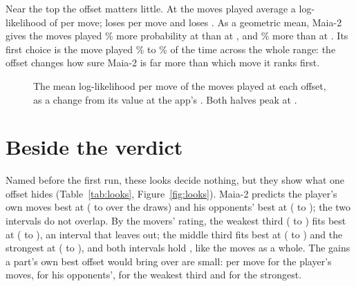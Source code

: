 \documentclass[11pt]{article}
\begin{document}
Near the top the offset matters little. At \AppOffset{} the moves played average a
log-likelihood of \LLBase{} per move; \OffsetMin{} loses \LossAtMin{} per move and \OffsetMax{}
loses \LossAtMax. As a geometric mean, Maia-2 gives the moves played \RatioAtMin\% more
probability at \AppOffset{} than at \OffsetMin, and \RatioAtMax\% more than at \OffsetMax. Its
first choice is the move played \TopMin\% to \TopMax\% of the time across the whole range: the
offset changes how sure Maia-2 is far more than which move it ranks first.

\begin{figure}[!htbp]
\centering
{}
\caption{The mean log-likelihood per move of the moves played at each offset, as a change from
its value at the app's \AppOffset. Both halves peak at \AppOffset.}
\label{fig:curve}
\end{figure}

\begin{table}[!htbp]
\centering\small
\OffsetTable
\caption{The mean log-likelihood per move at each offset, on each half and over all the games,
and the share of all the moves that are Maia-2's first choice.}
\label{tab:offsets}
\end{table}

\section{Beside the verdict}

Named before the first run, these looks decide nothing, but they show what one offset hides
(Table~\ref{tab:looks}, Figure~\ref{fig:looks}). Maia-2 predicts the player's own moves best at
\BestHim{} (\BestHimLo{} to \BestHimHi{} over the draws) and his opponents' best at \BestOpp{}
(\BestOppLo{} to \BestOppHi); the two intervals do not overlap. By the movers' rating, the
weakest third (\LowFrom{} to \LowTo) fits best at \LowBest{} (\LowLo{} to \LowHi), an interval
that leaves \AppOffset{} out; the middle third fits best at \MidBest{} (\MidLo{} to \MidHi) and
the strongest at \HighBest{} (\HighLo{} to \HighHi), and both intervals hold \AppOffset, like
the moves as a whole. The gains a part's own best offset would bring over \AppOffset{} are
small: \GainHim{} per move for the player's moves, \GainOpp{} for his opponents', \GainLow{}
for the weakest third and \GainHigh{} for the strongest.
\end{document}
